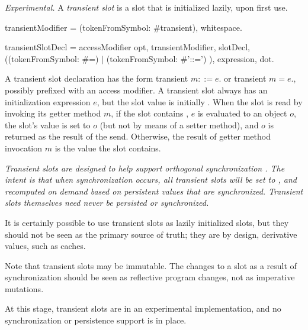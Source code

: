 \documentclass{article}
\newcommand{\code}[1]{{\sf #1}}
\begin{document}
{\it Experimental.}  A {\em transient slot} is a  slot that is initialized lazily, upon first use. 

\begin{newspeak}
transientModifier = (tokenFromSymbol: \#transient), whitespace.

transientSlotDecl = accessModifier opt, transientModifier, slotDecl, 
                    ((tokenFromSymbol: \#=) $|$ 
                      (tokenFromSymbol: \#'::=')
                     ), expression, dot.
\end{newspeak}

A transient slot declaration has the form \code{transient $m ::= e.$} or \code{transient $m = e.$}, possibly prefixed with an access modifier.
 A transient slot  always has an initialization expression $e$, but the slot value is initially \NIL{}.
When the slot is read by invoking its getter method $m$, if the slot contains \NIL{}, $e$ is evaluated to an object $o$, the slot's value is set to $o$ (but not by means of a setter method), and $o$ is returned as the result of the send.  Otherwise, the result of getter method invocation $m$ is the value the slot contains.  


{\it 
Transient slots are designed to help support {\em orthogonal synchronization} \cite{bracha05}. The intent is that when synchronization occurs, all transient slots will be set to \NIL{}, and recomputed on demand based on persistent values that are synchronized. Transient slots themselves need never be persisted or synchronized.

It is certainly possible to use transient slots as lazily initialized slots, but they should not be seen as the primary source of truth; they are by design, derivative values, such as caches.

Note that transient slots may be immutable. The changes to a slot as a result of synchronization should be seen as reflective program changes, not as imperative mutations.

At this stage, transient slots are in an experimental implementation, and no synchronization or persistence support is in place.
}
\end{document}
